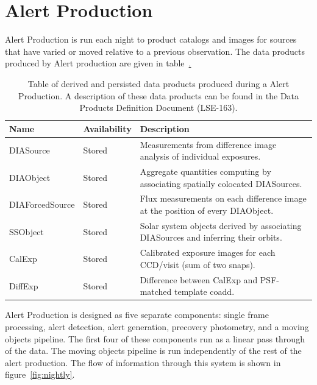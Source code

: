 \section{Alert Production}
\label{sec:ap}



Alert Production is run each night to product catalogs and images for sources that have varied or moved relative to a previous observation.  The data products produced by Alert production are given in  table~\hyperref[table:ap_data_products].

\begin{table}
\small
\begin{tabularx}{\textwidth}{ | l | l | X | }
  \hline
  {\bf Name} & {\bf Availability} & {\bf Description} \\
  \hline
  DIASource & Stored &
  Measurements from difference image analysis of individual exposures. \\
  \hline
  DIAObject& Stored &
  Aggregate quantities computing by associating spatially colocated DIASources. \\
  \hline
  DIAForcedSource & Stored &
  Flux measurements on each difference image at the position of every DIAObject. \\
  \hline
  SSObject & Stored &
  Solar system objects derived by associating DIASources and inferring their orbits. \\
  \hline
  CalExp & Stored &
  Calibrated exposure images for each CCD/visit (sum of two snaps). \\
  \hline
  DiffExp & Stored &
  Difference between CalExp and PSF-matched template coadd. \\
  \hline
\end{tabularx}
\caption{Table of derived and persisted data products produced during a Alert Production.  A description of these data products can be found in the Data Products Definition Document (LSE-163).
\label{table:ap_data_products}}
\end{table}


Alert Production is designed as five separate components: single frame
processing, alert detection, alert generation, precovery photometry,
and a moving objects pipeline. The first four of these components run
as a linear pass through of the data. The moving objects pipeline is
run independently of the rest of the alert production. The flow of
information through this system is shown in figure~\ref{fig:nightly}.

